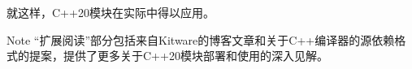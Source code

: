 
就这样，C++20模块在实际中得以应用。

\begin{myNotic}{Note}
“扩展阅读”部分包括来自Kitware的博客文章和关于C++编译器的源依赖格式的提案，提供了更多关于C++20模块部署和使用的深入见解。
\end{myNotic}
























